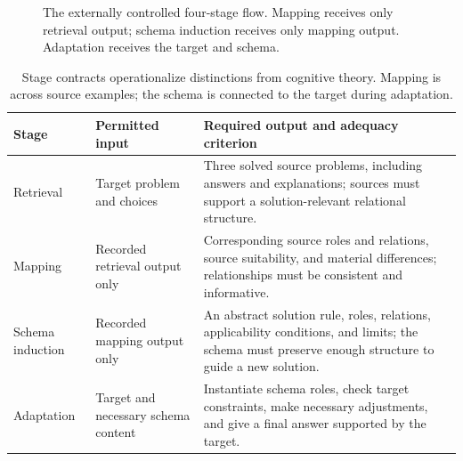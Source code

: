 \begin{figure}[t]
\centering
{}
\caption{The externally controlled four-stage flow. Mapping receives only retrieval output; schema induction receives only mapping output. Adaptation receives the target and schema.}
\label{fig:framework}
\end{figure}

\begin{table}[t]
\centering
\small
\begin{tabularx}{\textwidth}{@{}p{2.15cm}p{3.8cm}X@{}}
\toprule
Stage & Permitted input & Required output and adequacy criterion \\
\midrule
Retrieval & Target problem and choices & Three solved source problems, including answers and explanations; sources must support a solution-relevant relational structure. \\
Mapping & Recorded retrieval output only & Corresponding source roles and relations, source suitability, and material differences; relationships must be consistent and informative. \\
Schema induction & Recorded mapping output only & An abstract solution rule, roles, relations, applicability conditions, and limits; the schema must preserve enough structure to guide a new solution. \\
Adaptation & Target and necessary schema content & Instantiate schema roles, check target constraints, make necessary adjustments, and give a final answer supported by the target. \\
\bottomrule
\end{tabularx}
\caption{Stage contracts operationalize distinctions from cognitive theory. Mapping is across source examples; the schema is connected to the target during adaptation.}
\label{tab:contracts}
\end{table}

